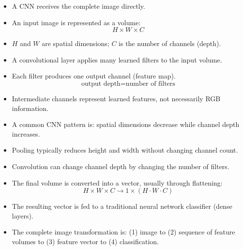 \highspace
\begin{takeawaysbox}
    \begin{itemize}
        \item A CNN receives the complete image directly.
        \item An input image is represented as a volume:
        \begin{equation*}
            H \times W \times C
        \end{equation*}
        \item $H$ and $W$ are spatial dimensions; $C$ is the number of channels (depth).
        \item A convolutional layer applies many learned filters to the input volume.
        \item Each filter produces one output channel (feature map).
        \begin{equation*}
            \text{output depth} = \text{number of filters}
        \end{equation*}
        \item Intermediate channels represent learned features, not necessarily RGB information.
        \item A common CNN pattern is: spatial dimensions decrease while channel depth increases.
        \item Pooling typically reduces height and width without changing channel count.
        \item Convolution can change channel depth by changing the number of filters.
        \item The final volume is converted into a vector, usually through flattening:
        \begin{equation*}
            H \times W \times C \to 1 \times (H \cdot W \cdot C)
        \end{equation*}
        \item The resulting vector is fed to a traditional neural network classifier (dense layers).
        \item The complete image transformation is: (1) image to (2) sequence of feature volumes to (3) feature vector to (4) classification.
    \end{itemize}
\end{takeawaysbox}